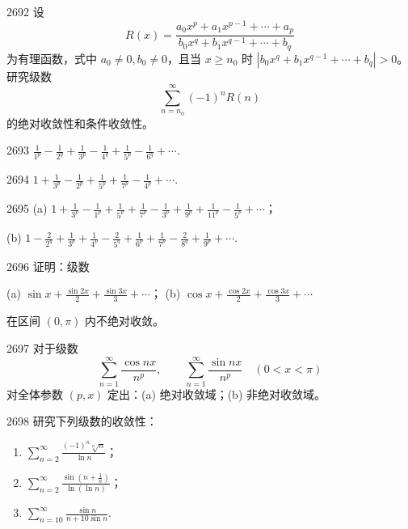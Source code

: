 \begin{prob}[M]{2692}
设
\[R(x) = \frac{a_0 x^p + a_1 x^{p-1} + \cdots + a_p}{b_0 x^q + b_1 x^{q-1} + \cdots + b_q}\]
为有理函数，式中 $a_0 \neq 0, b_0 \neq 0$，且当 $x \geqslant n_0$ 时 $|b_0 x^q + b_1 x^{q-1} + \cdots + b_q| > 0$。研究级数
\[\sum_{n=n_0}^{\infty} (-1)^n R(n)\]
的绝对收敛性和条件收敛性。
\end{prob}


\begin{prob}[S]{2693}
$\frac{1}{1^p} - \frac{1}{2^q} + \frac{1}{3^p} - \frac{1}{4^q} + \frac{1}{5^p} - \frac{1}{6^q} + \cdots$.
\end{prob}

\begin{prob}[S]{2694}
$1 + \frac{1}{3^p} - \frac{1}{2^p} + \frac{1}{5^p} + \frac{1}{7^p} - \frac{1}{4^p} + \cdots$.
\end{prob}

\begin{prob}[M]{2695}
(a) $1 + \frac{1}{3^p} - \frac{1}{1^p} + \frac{1}{5^p} + \frac{1}{7^p} - \frac{1}{3^p} + \frac{1}{9^p} + \frac{1}{11^p} - \frac{1}{5^p} + \cdots$；

(b) $1 - \frac{2}{2^q} + \frac{1}{3^p} + \frac{1}{4^p} - \frac{2}{5^q} + \frac{1}{6^p} + \frac{1}{7^p} - \frac{2}{8^q} + \frac{1}{9^p} + \cdots$.
\end{prob}

\begin{prob}[M]{2696}
证明：级数

(a) $\sin x + \frac{\sin 2x}{2} + \frac{\sin 3x}{3} + \cdots$； \qquad (b) $\cos x + \frac{\cos 2x}{2} + \frac{\cos 3x}{3} + \cdots$

在区间 $(0, \pi)$ 内不绝对收敛。
\end{prob}

\begin{prob}[M]{2697}
对于级数
\[\sum_{n=1}^{\infty} \frac{\cos nx}{n^p}, \qquad \sum_{n=1}^{\infty} \frac{\sin nx}{n^p} \quad (0 < x < \pi)\]
对全体参数 $(p, x)$ 定出：(a) 绝对收敛域；(b) 非绝对收敛域。
\end{prob}

\begin{prob}[L]{2698}
研究下列级数的收敛性：
\begin{enumerate}[label=(\alph*), itemsep=2pt, topsep=3pt]
\item $\sum_{n=2}^{\infty} \frac{(-1)^n \sqrt[n]{n}}{\ln n}$；
\item $\sum_{n=2}^{\infty} \frac{\sin\left(n + \frac{1}{n}\right)}{\ln(\ln n)}$；
\item $\sum_{n=10}^{\infty} \frac{\sin n}{n + 10 \sin n}$.
\end{enumerate}
\end{prob}

